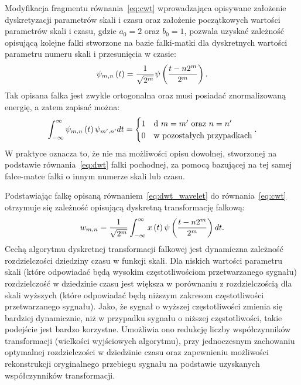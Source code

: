 Modyfikacja fragmentu równania~\eqref{eq:cwt} wprowadzająca opisywane założenie dyskretyzacji parametrów skali i czasu oraz założenie początkowych wartości parametrów skali i czasu, gdzie $a_{0} = 2$ oraz $b_{0} = 1$, pozwala uzyskać zależność opisującą kolejne falki stworzone na bazie falki-matki dla dyskretnych wartości parametru numeru skali i przesunięcia w czasie:
\begin{equation}
\psi_{m,n} \left(t\right) = \frac{1}{\sqrt{2^{m}}} \psi \left(\frac{t - n 2^{m}}{2^{m}}\right) \label{eq:dwt_wavelet}.
\end{equation}
Tak opisana falka jest zwykle ortogonalna oraz musi posiadać znormalizowaną energię, a zatem zapisać można:
\begin{equation}
\int _{-\infty} ^{\infty} \psi_{m,n} \emb{t} \psi_{m',n'} dt =
\begin{cases}
	1 & $d $ m = m' $ oraz $ n = n' \\
	0 & $w pozostałych przypadkach$
\end{cases}
\label{eq:dwt_orthogonal}.
\end{equation}
W praktyce oznacza to, że nie ma możliwości opisu dowolnej, stworzonej na podstawie równania~\eqref{eq:dwt} falki pochodnej, za pomocą bazującej na tej samej falce-matce falki o innym numerze skali lub czasu.

Podstawiając falkę opisaną równaniem~\eqref{eq:dwt_wavelet} do równania~\eqref{eq:cwt} otrzymuje się zależność opisującą dyskretną transformację falkową:
\begin{equation}
w_{m,n} = \frac{1}{\sqrt{2^{m}}} \int _{-\infty} ^{\infty} x \left(t\right) \psi \left(\frac{t - n 2^{m}}{2^{m}}\right) dt \label{eq:dwt}.
\end{equation}
Cechą algorytmu dyskretnej transformacji falkowej jest dynamiczna zależność rozdzielczości dziedziny czasu w funkcji skali. Dla niskich wartości parametru skali (które odpowiadać będą wysokim częstotliwościom przetwarzanego sygnału) rozdzielczość w dziedzinie czasu jest większa w porównaniu z rozdzielczością dla skali wyższych (które odpowiadać będą niższym zakresom częstotliwości przetwarzanego sygnału). Jako, że sygnał o wyższej częstotliwości zmienia się bardziej dynamicznie, niż w przypadku sygnału o niższej częstotliwości, takie podejście jest bardzo korzystne. Umożliwia ono redukcję liczby współczynników transformacji (wielkości wyjściowych algorytmu), przy jednoczesnym zachowaniu optymalnej rozdzielczości w dziedzinie czasu oraz zapewnieniu możliwości rekonstrukcji oryginalnego przebiegu sygnału na podstawie uzyskanych współczynników transformacji.

